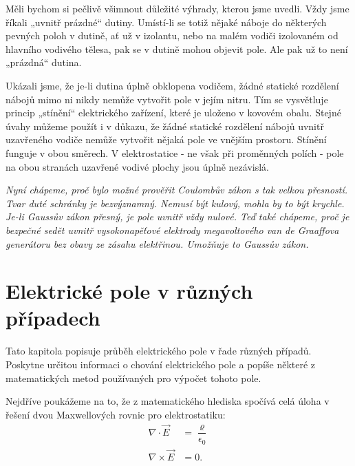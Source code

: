  Měli bychom si pečlivě všimnout důležité výhrady, kterou jsme uvedli. Vždy jsme říkali 
  „uvnitř prázdné“ dutiny. Umístí-li se totiž nějaké náboje do některých pevných poloh v 
  dutině, ať už v izolantu, nebo na malém vodiči izolovaném od hlavního vodivého tělesa, pak se 
  v dutině mohou objevit pole. Ale pak už to není „prázdná“ dutina.
  
  Ukázali jsme, že je-li dutina úplně obklopena vodičem, žádné statické rozdělení nábojů mimo 
  ni nikdy nemůže vytvořit pole v jejím nitru. Tím se vysvětluje princip „stínění“ elektrického 
  zařízení, které je uloženo v kovovém obalu. Stejné úvahy můžeme použít i v důkazu, že žádné 
  statické rozdělení nábojů uvnitř uzavřeného vodiče nemůže vytvořit nějaká pole ve vnějším 
  prostoru. Stínění funguje v obou směrech. V elektrostatice - ne však při proměnných polích - 
  pole na obou stranách uzavřené vodivé plochy jsou úplně nezávislá.
  
  \emph{Nyní chápeme, proč bylo možné prověřit Coulombův zákon s tak velkou přesností. Tvar 
  duté schránky je bezvýznamný. Nemusí být kulový, mohla by to být krychle. Je-li Gaussův zákon 
  přesný, je pole uvnitř vždy nulové. Teď také chápeme, proč je bezpečné sedět uvnitř 
  vysokonapěťové elektrody megavoltového van de Graaffova generátoru bez obavy ze zásahu 
  elektřinou. Umožňuje to Gaussův zákon.}

\section{Elektrické pole v různých případech}\label{fyz:IIchapVsecX}
  Tato kapitola popisuje průběh elektrického pole v řade různých případů. Poskytne určitou 
  informaci o chování elektrického pole a popíše některé z matematických metod používaných pro 
  výpočet tohoto pole.
  
  Nejdříve poukážeme na to, že z matematického hlediska spočívá celá úloha v řešení dvou 
  Maxwellových rovnic pro elektrostatiku:
  \begin{align}
    \nabla\cdot\vec{E}  &= \dfrac{\varrho}{\epsilon_0}  \label{fyz:eq_fey_001} \\
    \nabla\times\vec{E} &= 0.                           \label{fyz:eq_fey_002}
  \end{align}
  
